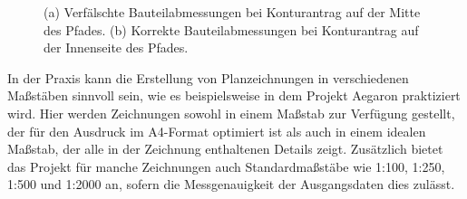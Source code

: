 \begin{figure}[h!tbp]
\begin{subfigure}{.35\textwidth}
  \caption{}
\end{subfigure}%
\caption{(a) Verfälschte Bauteilabmessungen bei Konturantrag auf der Mitte des Pfades. (b) Korrekte Bauteilabmessungen bei Konturantrag auf der Innenseite des Pfades.}
\label{abb:vektor_grafischeFeinheiten}
\end{figure}

In der Praxis kann die Erstellung von Planzeichnungen in verschiedenen Maßstäben sinnvoll sein, wie es beispielsweise in dem Projekt Aegaron praktiziert wird. Hier werden Zeichnungen sowohl in einem Maßstab zur Verfügung gestellt, der für den Ausdruck im A4-Format optimiert ist als auch in einem idealen Maßstab, der alle in der Zeichnung enthaltenen Details zeigt. Zusätzlich bietet das Projekt für manche Zeichnungen auch Standardmaßstäbe wie 1:100, 1:250, 1:500 und 1:2000 an, sofern die Messgenauigkeit der Ausgangsdaten dies zulässt.


